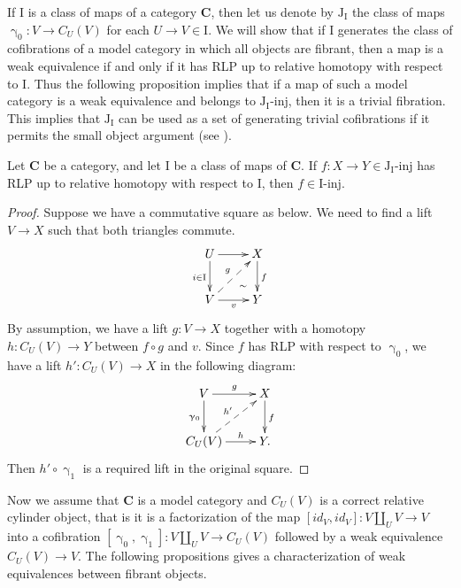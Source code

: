 \documentclass{tac}
\theoremstyle{definition}
\newcommand{\cat}[1]{\mathbf{#1}}
\newcommand{\C}{\cat{C}}
\newcommand{\I}{\mathrm{I}}
\newcommand{\J}{\mathrm{J}}
\newcommand{\class}[2]{#1\text{-}\mathrm{#2}}
\newcommand{\Iinj}[1][\I]{\class{#1}{inj}}
\newcommand{\Jinj}[1][]{\Iinj[\J#1]}
\newcommand{\cyli}{\upgamma}
\begin{document}
If $\I$ is a class of maps of a category $\C$, then let us denote by $\J_\I$ the class of maps $\cyli_0 : V \to C_U(V)$ for each $U \to V \in \I$.
We will show that if $\I$ generates the class of cofibrations of a model category in which all objects are fibrant,
then a map is a weak equivalence if and only if it has RLP up to relative homotopy with respect to $\I$.
Thus the following proposition implies that if a map of such a model category is a weak equivalence and belongs to $\Jinj[_\I]$, then it is a trivial fibration.
This implies that $\J_\I$ can be used as a set of generating trivial cofibrations if it permits the small object argument (see ).

\begin{prop}
Let $\C$ be a category, and let $\I$ be a class of maps of $\C$.
If $f : X \to Y \in \Jinj[_\I]$ has RLP up to relative homotopy with respect to $\I$, then $f \in \Iinj$.
\end{prop}
\begin{proof}
Suppose we have a commutative square as below.
We need to find a lift $V \to X$ such that both triangles commute.
\[ \xymatrix{ U \ar[d]_{i \in \I} \ar[r] \ar@{}[dr]|(.7){\sim} & X \ar[d]^f \\
              V \ar[r]_v \ar@{-->}[ur]^g                       & Y
            } \]
By assumption, we have a lift $g : V \to X$ together with
a homotopy $h : C_U(V) \to Y$ between $f \circ g$ and $v$.
Since $f$ has RLP with respect to $\cyli_0$, we have a lift $h' : C_U(V) \to X$ in the following diagram:
\[ \xymatrix{ V \ar[r]^g \ar[d]_{\cyli_0}         & X \ar[d]^f \\
              C_U(V) \ar[r]^-h \ar@{-->}[ur]^{h'} & Y.
            } \]
Then $h' \circ \cyli_1$ is a required lift in the original square.
\end{proof}

Now we assume that $\C$ is a model category and $C_U(V)$ is a correct relative cylinder object, that is it is a factorization of the map $[id_V,id_V] : V \amalg_U V \to V$
into a cofibration $[\cyli_0,\cyli_1] : V \amalg_U V \to C_U(V)$ followed by a weak equivalence $C_U(V) \to V$.
The following propositions gives a characterization of weak equivalences between fibrant objects.
\end{document}
